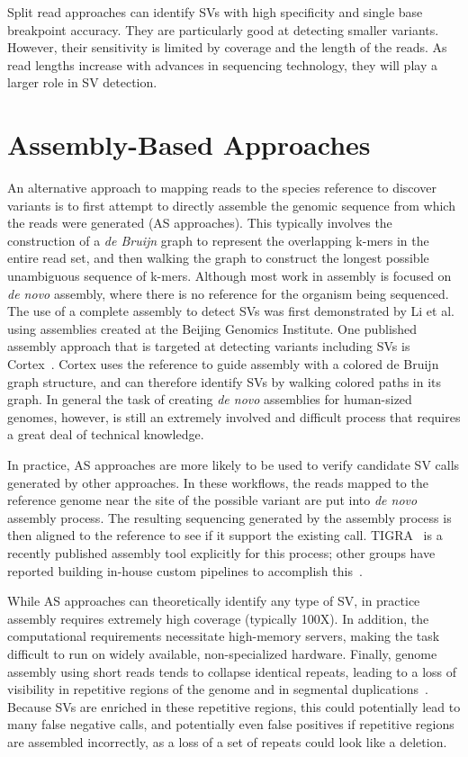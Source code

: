 Split read approaches can identify SVs with high specificity and single base breakpoint accuracy. They are particularly good at detecting smaller variants. However, their sensitivity is limited by coverage and the length of the reads. As read lengths increase with advances in sequencing technology, they will play a larger role in SV detection.

\section{Assembly-Based Approaches}

An alternative approach to mapping reads to the species reference to discover variants is to first attempt to directly assemble the genomic sequence from which the reads were generated (AS approaches). This typically involves the construction of a \emph{de Bruijn} graph to represent the overlapping k-mers in the entire read set, and then walking the graph to construct the longest possible unambiguous sequence of k-mers. Although most work in assembly is focused on \emph{de novo} assembly, where there is no reference for the organism being sequenced. The use of a complete assembly to detect SVs was first demonstrated by Li et al.~\cite{Li:2011p1734} using assemblies created at the Beijing Genomics Institute. One published assembly approach that is targeted at detecting variants including SVs is Cortex~\cite{Iqbal:2012p1837}. Cortex uses the reference to guide assembly with a colored de Bruijn graph structure, and can therefore identify SVs by walking colored paths in its graph. In general the task of creating \emph{de novo} assemblies for human-sized genomes, however, is still an extremely involved and difficult process that requires a great deal of technical knowledge.

In practice, AS approaches are more likely to be used to verify candidate SV calls generated by other approaches. In these workflows, the reads mapped to the reference genome near the site of the possible variant are put into \emph{de novo} assembly process. The resulting sequencing generated by the assembly process is then aligned to the reference to see if it support the existing call. TIGRA~\cite{Chen:2013gf} is a recently published assembly tool explicitly for this process; other groups have reported building in-house custom pipelines to accomplish this~\cite{Pleasance:2010p533,Malhotra:2013eh}.

While AS approaches can theoretically identify any type of SV, in practice assembly requires extremely high coverage (typically 100X). In addition, the computational requirements necessitate high-memory servers, making the task difficult to run on widely available, non-specialized hardware. Finally, genome assembly using short reads tends to collapse identical repeats, leading to a loss of visibility in repetitive regions of the genome and in segmental duplications~\cite{Alkan:2011hs}. Because SVs are enriched in these repetitive regions, this could potentially lead to many false negative calls, and potentially even false positives if repetitive regions are assembled incorrectly, as a loss of a set of repeats could look like a deletion. 

